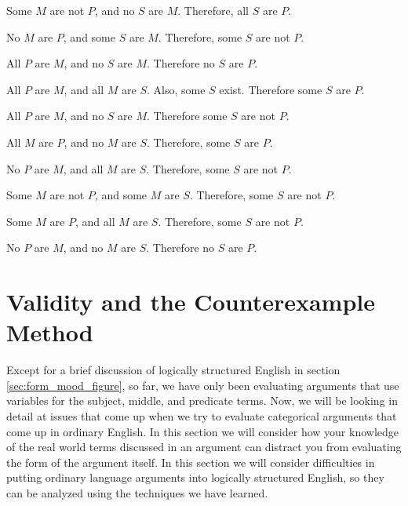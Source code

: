 \begin{exercises} 
 
\item Some $M$ are not $P$, and no $S$ are $M$. Therefore, all $S$ are $P$.
 
\item No $M$ are $P$, and some $S$ are $M$. Therefore, some $S$ are not $P$.
 
\item All $P$ are $M$, and no $S$ are $M$. Therefore no $S$ are $P$. 
 
\item All $P$ are $M$, and all $M$ are $S$. Also, some $S$ exist. Therefore some $S$ are $P$. 
  
\item All $P$ are $M$, and no $S$ are $M$. Therefore some $S$ are not $P$. 
 
\item All $M$ are $P$, and no $M$ are $S$. Therefore, some $S$ are $P$.
 
\item No $P$ are $M$, and all $M$ are $S$. Therefore, some $S$ are not $P$.
 
\item Some $M$ are not $P$, and some $M$ are $S$. Therefore, some $S$ are not $P$.
  
\item Some $M$ are $P$, and all $M$ are $S$. Therefore, some $S$ are not $P$.
 
\item No $P$ are $M$, and no $M$ are $S$. Therefore no $S$ are $P$.
 
\end{exercises}



\section{Validity and the Counterexample Method} 

Except for a brief discussion of logically structured English in section \ref{sec:form_mood_figure}, so far, we have only been evaluating arguments that use variables for the subject, middle, and predicate terms. Now, we will be looking in detail at issues that come up when we try to evaluate categorical arguments that come up in ordinary English. In this section we will consider how your knowledge of the real world terms discussed in an argument can distract you from evaluating the form of the argument itself. In this section we will consider difficulties in putting ordinary language arguments into logically structured English, so they can be analyzed using the techniques we have learned. 

